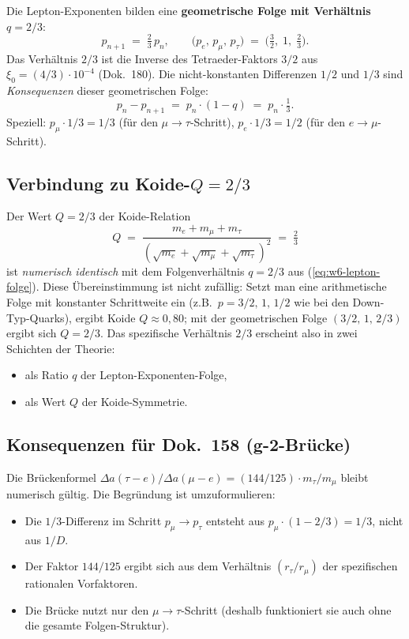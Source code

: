 Die Lepton-Exponenten bilden eine \textbf{geometrische Folge mit
Verhältnis $q = 2/3$}:
\begin{equation}
  p_{n+1} \;=\; \tfrac{2}{3}\, p_n,
  \qquad
  \bigl(p_e,\, p_\mu,\, p_\tau\bigr)
  \;=\; \bigl(\tfrac{3}{2},\;1,\;\tfrac{2}{3}\bigr).
  \label{eq:w6-lepton-folge}
\end{equation}
Das Verhältnis $2/3$ ist die Inverse des Tetraeder-Faktors $3/2$ aus
$\xi_0 = (4/3) \cdot 10^{-4}$ (Dok.~180). Die nicht-konstanten
Differenzen $1/2$ und $1/3$ sind \emph{Konsequenzen} dieser
geometrischen Folge:
\begin{equation}
  p_n - p_{n+1} \;=\; p_n \cdot (1 - q) \;=\; p_n \cdot \tfrac{1}{3}.
\end{equation}
Speziell: $p_\mu \cdot 1/3 = 1/3$ (für den $\mu \to \tau$-Schritt),
$p_e \cdot 1/3 = 1/2$ (für den $e \to \mu$-Schritt).

\subsection*{Verbindung zu Koide-$Q = 2/3$}

Der Wert $Q = 2/3$ der Koide-Relation
\begin{equation}
  Q \;=\; \frac{m_e + m_\mu + m_\tau}{(\sqrt{m_e}+\sqrt{m_\mu}+\sqrt{m_\tau})^2}
  \;=\; \tfrac{2}{3}
\end{equation}
ist \emph{numerisch identisch} mit dem Folgenverhältnis $q = 2/3$ aus
(\ref{eq:w6-lepton-folge}). Diese Übereinstimmung ist nicht zufällig:
Setzt man eine arithmetische Folge mit konstanter Schrittweite ein
(z.B.\ $p = 3/2,\,1,\,1/2$ wie bei den Down-Typ-Quarks), ergibt Koide
$Q \approx 0{,}80$; mit der geometrischen Folge $(3/2,\,1,\,2/3)$
ergibt sich $Q = 2/3$. Das spezifische Verhältnis $2/3$ erscheint
also in zwei Schichten der Theorie:
\begin{itemize}[leftmargin=2em,itemsep=2pt,topsep=2pt]
  \item als Ratio $q$ der Lepton-Exponenten-Folge,
  \item als Wert $Q$ der Koide-Symmetrie.
\end{itemize}

\subsection*{Konsequenzen für Dok.~158 (g-2-Brücke)}

Die Brückenformel
$\Delta a(\tau{-}e)/\Delta a(\mu{-}e) = (144/125) \cdot m_\tau/m_\mu$
bleibt numerisch gültig. Die Begründung ist umzuformulieren:
\begin{itemize}[leftmargin=2em,itemsep=2pt,topsep=2pt]
  \item Die $1/3$-Differenz im Schritt $p_\mu \to p_\tau$ entsteht aus
        $p_\mu \cdot (1 - 2/3) = 1/3$, nicht aus $1/D$.
  \item Der Faktor $144/125$ ergibt sich aus dem Verhältnis
        $(r_\tau/r_\mu)$ der spezifischen rationalen Vorfaktoren.
  \item Die Brücke nutzt nur den $\mu \to \tau$-Schritt (deshalb
        funktioniert sie auch ohne die gesamte Folgen-Struktur).
\end{itemize}


